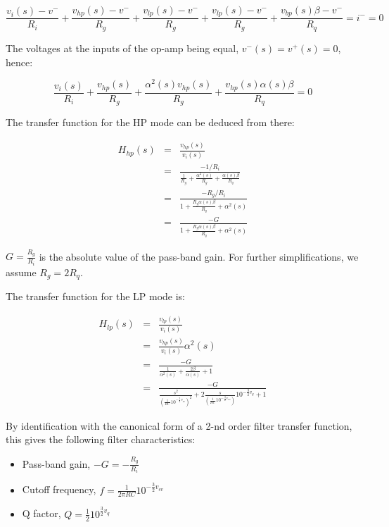 \documentclass[a4paper,11pt]{article}
\begin{document}
\begin{equation}
\frac{v_i(s) - v^-}{R_i} + \frac{v_{hp}(s) - v^-}{R_g} + \frac{v_{lp}(s) - v^-}{R_g} + \frac{v_{lp}(s) - v^-}{R_g} + \frac{v_{bp}(s) \beta - v^-}{R_q} = i^- = 0
\end{equation}


The voltages at the inputs of the op-amp being equal, $v^-(s) = v^+(s) = 0$, hence:

\begin{equation}
\frac{v_i(s)}{R_i} + \frac{v_{hp}(s)}{R_g} + \frac{\alpha^2(s) v_{hp}(s)}{R_g} + \frac{v_{hp}(s) \alpha(s) \beta}{R_q} = 0
\end{equation}

The transfer function for the HP mode can be deduced from there:

\begin{eqnarray}
H_{hp}(s) &=& \frac{v_{hp}(s)}{v_i(s)} \\
 &=& \frac{-1 / R_i}{\frac{1}{R_g} + \frac{\alpha^2(s)}{R_g} + \frac{\alpha(s)\beta}{R_q}} \\
 &=& \frac{-R_g / R_i}{1 + \frac{R_g \alpha(s)\beta}{R_q} + \alpha^2(s)} \\
 &=& \frac{-G}{1 + \frac{R_g \alpha(s)\beta}{R_q} + \alpha^2(s)}
\end{eqnarray}

$G = \frac{R_g}{R_i}$ is the absolute value of the pass-band gain. For further simplifications, we assume $R_g = 2 R_q$.

The transfer function for the LP mode is:

\begin{eqnarray}
H_{lp}(s) &=& \frac{v_{lp}(s)}{v_i(s)} \\
 &=& \frac{v_{hp}(s)}{v_i(s)} \alpha^2(s) \\
 &=& \frac{-G}{\frac{1}{\alpha^2(s)} + \frac{2\beta}{\alpha(s)} + 1} \\
 &=& \frac{-G}{\frac{s^2}{{\left(\frac{1}{RC} 10 ^ {-\frac{3}{2} v_{cv}}\right)}^2} + 2 \frac{s}{{\left(\frac{1}{RC} 10 ^ {-\frac{3}{2} v_{cv}}\right)}} 10^{-\frac{3}{2} v_{q}} + 1}
\end{eqnarray}

By identification with the canonical form of a 2-nd order filter transfer function, this gives the following filter characteristics:

\begin{itemize}
\item Pass-band gain, $-G = -\frac{R_g}{R_i}$
\item Cutoff frequency, $f = \frac{1}{2 \pi R C} 10 ^ {-\frac{3}{2} v_{cv}}$
\item Q factor, $Q = \frac{1}{2} 10^{\frac{3}{2} v_{q}} $

\end{itemize}
\end{document}
